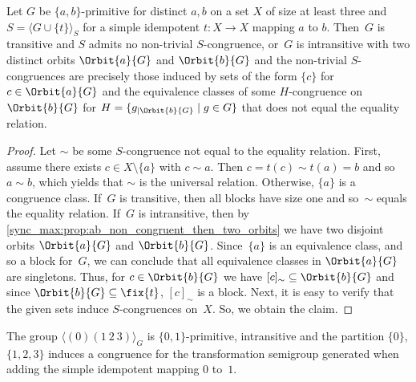\begin{proposition}
	Let $G$ be $\{a,b\}$-primitive for distinct $a, b$ on a set $X$ of size at least three
	and $S = \langle G \cup \{t\} \rangle_S$
	for a simple idempotent $t \colon X \to X$ mapping $a$ to $b$.
	Then~$G$ is transitive and $S$ admits
	no non-trivial $S$-congruence,
	or~$G$ is intransitive 
	with two distinct orbits $\Orbit{a}{G}$
	and $\Orbit{b}{G}$
	and the non-trivial $S$-congruences
	are precisely those induced by sets of the form $\{c\}$
	for $c \in \Orbit{a}{G}$
	and the equivalence classes 
	of some $H$-congruence on  $\Orbit{b}{G}$ for $H = \{ g_{|\Orbit{b}{G}} \mid g \in G \}$
	that does not equal the equality relation.
\end{proposition}
\begin{proof}
	Let $\sim$ be some $S$-congruence not equal to the equality relation.
	First, assume there exists $c \in X \setminus \{a\}$
	with $c \sim a$. Then $c = t(c) \sim t(a) = b$
	and so $a \sim b$, which yields that $\sim$
	is the universal relation.
	Otherwise, $\{a\}$ is a congruence class.
	If~$G$ is transitive, then all blocks have size one
	and so~$\sim$ equals the equality relation.
	If~$G$ is intransitive, 
	then by \cref{sync_max:prop:ab_non_congruent_then_two_orbits} 
	we have two disjoint orbits $\Orbit{a}{G}$
	and $\Orbit{b}{G}$.
	Since~$\{a\}$ is an equivalence class, and so a block for~$G$,
	we can conclude that all equivalence classes
	in $\Orbit{a}{G}$ are singletons.
	Thus, for $c \in \Orbit{b}{G}$
	we have $[c]_{\sim} \subseteq \Orbit{b}{G}$
	and since $\Orbit{b}{G} \subseteq \fix{t}$,
	$[c]_{\sim}$ is a block.
	Next, it is easy to verify that the given sets induce $S$-congruences on~$X$.
	So, we obtain the claim.		
\end{proof}

\begin{example}
	The group $\langle (0)(1 ~ 2 ~ 3) \rangle_G$
	is $\{0,1\}$-primitive, intransitive
	and the partition $\{0\}$, $\{1,2,3\}$
	induces a congruence for the transformation semigroup
	generated when adding the simple idempotent mapping $0$
	to~$1$.	
\end{example}